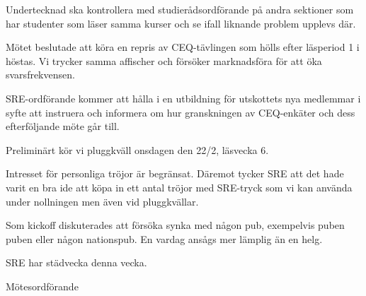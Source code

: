 \documentclass[10pt]{article}
\def\mo{Pontus Landgren}
\begin{document}
\begin{paragrafer}
Undertecknad ska kontrollera med studierådsordförande på andra sektioner som har studenter som läser samma kurser och se ifall liknande problem upplevs där.

Mötet beslutade att köra en repris av CEQ-tävlingen som hölls efter läsperiod 1 i höstas. Vi trycker samma affischer och försöker marknadsföra för att öka svarsfrekvensen.

SRE-ordförande kommer att hålla i en utbildning för utskottets nya medlemmar i syfte att instruera och informera om hur granskningen av CEQ-enkäter och dess efterföljande möte går till.

Preliminärt kör vi pluggkväll onsdagen den 22/2, läsvecka 6.

Intresset för personliga tröjor är begränsat. Däremot tycker SRE att det hade varit en bra ide att köpa in ett antal tröjor med SRE-tryck som vi kan använda under nollningen men även vid pluggkvällar.  

Som kickoff diskuterades att försöka synka med någon pub, exempelvis puben puben eller någon nationspub. En vardag ansågs mer lämplig än en helg.

SRE har städvecka denna vecka.

\end{paragrafer}

\hidesignfoot
\begin{signatures}{1}
\signature{\mo}{Mötesordförande}
\end{signatures}
\end{document}
